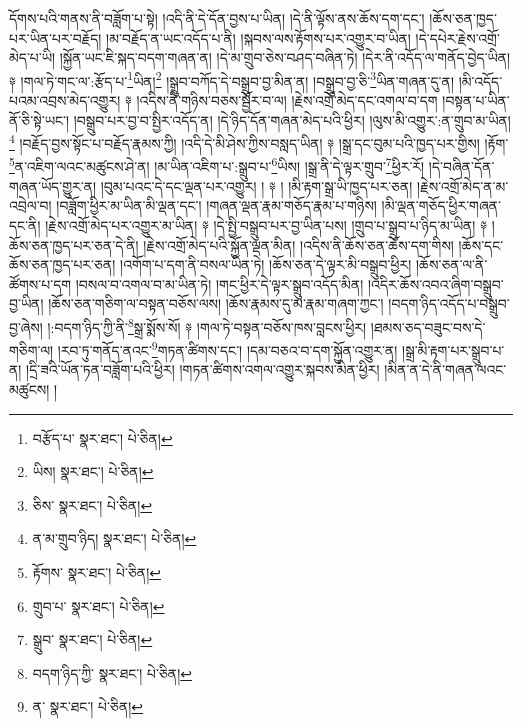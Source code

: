 དོགས་པའི་གནས་ནི་བཟློག་པ་སྟེ། །འདི་ནི་དེ་དོན་བྱས་པ་ཡིན། །དེ་ནི་ལྟོས་ནས་ཆོས་དག་དང་། །ཆོས་ཅན་ཁྱད་པར་ཡིན་པར་བརྗོད། །མ་བརྗོད་ན་ཡང་འདོད་པ་ནི། །སྐབས་ལས་རྟོགས་པར་འགྱུར་བ་ཡིན། །དེ་དཔེར་རྗེས་འགྲོ་མེད་པ་ཡི། །སྐྱོན་ཡང་ཇི་སྐད་བདག་གཞན་ན། །དེ་མ་གྲུབ་ཅེས་བཤད་བཞིན་ཏེ། །དེར་ནི་འདོད་ལ་གནོད་བྱེད་ཡིན། ༈ །གལ་ཏེ་གང་ལ་:རྩོད་པ་\footnote{བརྩོད་པ་  སྣར་ཐང་།  པེ་ཅིན། }ཡིན།\footnote{ཡིས།  སྣར་ཐང་།  པེ་ཅིན། } །སྒྲུབ་བཀོད་དེ་བསྒྲུབ་བྱ་མིན་ན། །བསྒྲུབ་བྱ་ཅི་\footnote{ཅིས་  སྣར་ཐང་།  པེ་ཅིན། }ཡིན་གཞན་དུ་ན། །མི་འདོད་པའམ་འབྲས་མེད་འགྱུར། ༈ །འདིས་ནི་གཉིས་བཅས་སྦྱོར་བ་ལ། །རྗེས་འགྲོ་མེད་དང་འགལ་བ་དག །བསྟན་པ་ཡིན་ནོ་ཅི་སྟེ་ཡང་། །བསྒྲུབ་པར་བྱ་བ་སྤྱིར་འདོད་ན། །དེ་ཉིད་དོན་གཞན་མེད་པའི་ཕྱིར། །ལུས་མི་འགྱུར་:ན་གྲུབ་མ་ཡིན།\footnote{ན་མ་གྲུབ་ཉིད།  སྣར་ཐང་།  པེ་ཅིན། } །བརྗོད་བྱས་སྟོང་པ་བརྗོད་རྣམས་ཀྱི། །འདི་དེ་མི་ཤེས་ཀྱིས་བསླད་ཡིན། ༈ །སྒྲ་དང་བུམ་པའི་ཁྱད་པར་གྱིས། །རྟོག་\footnote{རྟོགས་  སྣར་ཐང་།  པེ་ཅིན། }ན་འཇིག་ལའང་མཚུངས་ཤེ་ན། །མ་ཡིན་འཇིག་པ་:སྒྲུབ་པ་\footnote{གྲུབ་པ་  སྣར་ཐང་།  པེ་ཅིན། }ཡིས། །སྒྲ་ནི་དེ་ལྟར་གྲུབ་\footnote{སྒྲུབ་  སྣར་ཐང་།  པེ་ཅིན། }ཕྱིར་རོ། །དེ་བཞིན་དོན་གཞན་ཡོད་གྱུར་ན། །བུམ་པའང་དེ་དང་ལྡན་པར་འགྱུར། ། ༈ ། །མི་རྟག་སྒྲ་ཡི་ཁྱད་པར་ཅན། །རྗེས་འགྲོ་མེད་ན་མ་འབྲེལ་བ། །བཟློག་ཕྱིར་མ་ཡིན་མི་ལྡན་དང་། །གཞན་ལྡན་རྣམ་གཅོད་རྣམ་པ་གཉིས། །མི་ལྡན་གཅོད་ཕྱིར་གཞན་དང་ནི། །རྗེས་འགྲོ་མེད་པར་འགྱུར་མ་ཡིན། ༈ །དེ་སྤྱི་བསྒྲུབ་པར་བྱ་ཡིན་པས། །གྲུབ་པ་སྒྲུབ་པ་ཉིད་མ་ཡིན། ༈ །ཆོས་ཅན་ཁྱད་པར་ཅན་དེ་ནི། །རྗེས་འགྲོ་མེད་པའི་སྐྱོན་ལྡན་མིན། །འདིས་ནི་ཆོས་ཅན་ཆོས་དག་གིས། །ཆོས་དང་ཆོས་ཅན་ཁྱད་པར་ཅན། །འགོག་པ་དག་ནི་བསལ་ཡིན་ཏེ། །ཆོས་ཅན་དེ་ལྟར་མི་བསྒྲུབ་ཕྱིར། །ཆོས་ཅན་ལ་ནི་ཚོགས་པ་དག །བསལ་བ་འགལ་བ་མ་ཡིན་ཏེ། །གང་ཕྱིར་དེ་ལྟར་སྒྲུབ་འདོད་མིན། །འདིར་ཆོས་འབའ་ཞིག་བསྒྲུབ་བྱ་ཡིན། །ཆོས་ཅན་གཅིག་ལ་བསྟན་བཅོས་ལས། །ཆོས་རྣམས་དུ་མ་རྣམ་གཞག་ཀྱང་། །བདག་ཉིད་འདོད་པ་བསྒྲུབ་བྱ་ཞེས། །:བདག་ཉིད་ཀྱི་ནི་\footnote{བདག་ཉིད་ཀྱི་  སྣར་ཐང་།  པེ་ཅིན། }སྒྲ་སྨོས་སོ། ༈ །གལ་ཏེ་བསྟན་བཅོས་ཁས་བླངས་ཕྱིར། །ཐམས་ཅད་བཟུང་བས་དེ་གཅིག་ལ། །རབ་ཏུ་གནོད་ནའང་\footnote{ན་  སྣར་ཐང་།  པེ་ཅིན། }གཏན་ཚིགས་དང་། །དམ་བཅའ་བ་དག་སྐྱོན་འགྱུར་ན། །སྒྲ་མི་རྟག་པར་སྒྲུབ་པ་ན། །དྲི་ཟའི་ཡོན་ཏན་བཟློག་པའི་ཕྱིར། །གཏན་ཚིགས་འགལ་འགྱུར་སྐབས་མིན་ཕྱིར། །མིན་ན་དེ་ནི་གཞན་ལའང་མཚུངས། །
